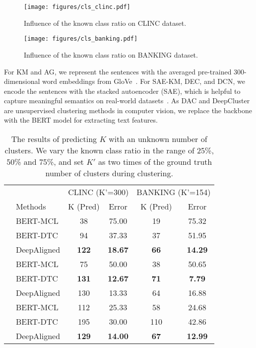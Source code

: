 \documentclass[letterpaper]{article} \usepackage{aaai21}  \usepackage{times}  \usepackage{helvet} \usepackage{courier}  \usepackage[hyphens]{url}  \usepackage{graphicx} \urlstyle{rm} \def\UrlFont{\rm}  \usepackage{natbib}  \usepackage{caption} \frenchspacing  \setlength{\pdfpagewidth}{8.5in}  \setlength{\pdfpageheight}{11in}  \usepackage{amsmath}
\begin{document}
	\begin{figure*}[t!]
		\centering 
		\texttt{[image: figures/cls\_clinc.pdf]}
		\caption{\label{results-aba-2-1} Influence of the known class ratio on CLINC dataset.}
	\end{figure*}
	\begin{figure*}[t!]
		\centering  
		\texttt{[image: figures/cls\_banking.pdf]}
		\caption{\label{results-aba-2-2} Influence of the known class ratio on BANKING dataset.}
	\end{figure*}
	
	For KM and AG, we represent the sentences with the averaged pre-trained 300-dimensional word embeddings from GloVe~\cite{pennington2014glove}. For SAE-KM, DEC, and DCN, we encode the sentences with the stacked autoencoder (SAE), which is helpful to capture meaningful semantics on real-world datasets~\cite{xie2016unsupervised}. As DAC and DeepCluster are unsupervised clustering methods in computer vision, we replace the backbone with the BERT model for extracting text features.
	\begin{table}\small
		\centering
		\begin{tabular}{@{\extracolsep{0.6pt}}clcccc}
			\toprule
			\centering
&  & \multicolumn{2}{c}{CLINC (K'=300)} & \multicolumn{2}{c}{BANKING (K'=154)} \\
			\addlinespace[0.1cm] \cline{3-4} \cline{5-6}  \addlinespace[0.1cm]
			& Methods &  K (Pred) & Error& K (Pred) & Error\\
			\midrule
			\multirow{3.5}{*}[1ex]{\rotatebox[origin=c]{90}{\it 25\%}} 
&  BERT-MCL & 38 & 75.00 & 19 & 75.32 \\
			&  BERT-DTC & 94 & 37.33 & 37 & 51.95 \\							
			& DeepAligned  & \textbf{122} & \textbf{18.67} & \textbf{66} & \textbf{14.29}\\
			\midrule
			\midrule
			\multirow{1.5}{*}[-1.5ex]{\rotatebox[origin=c]{90}{\it 50\%}}
			& BERT-MCL & 75	& 50.00	& 38 & 50.65	\\
			&  BERT-DTC & \textbf{131} & \textbf{12.67} & \textbf{71} & \textbf{7.79} \\							
			& DeepAligned &130	&13.33	&64	&16.88\\
			\midrule
			\midrule
			\multirow{1.5}{*}[-1.5ex]{\rotatebox[origin=c]{90}{\it 75\%}}
			& BERT-MCL & 112 & 25.33 	& 58 &  24.68 \\
			&  BERT-DTC & 195 & 30.00 & 110 & 42.86 \\							
			& DeepAligned &\textbf{129}	&\textbf{14.00}	&\textbf{67}	&\textbf{12.99}	\\
			\bottomrule
		\end{tabular}
		\caption{  
			The results of predicting $K$ with an unknown number of clusters. We vary the known class ratio in the range of 25\%, 50\% and 75\%, and set $K'$ as two times of the ground truth number of clusters during clustering. 
		}
		\label{aba-4} 
	\end{table}
\end{document}
